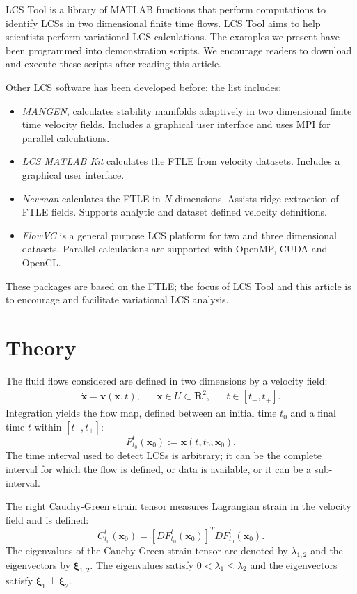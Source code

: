 \documentclass{article}
\newcommand{\reals}{\mathbf R}
\begin{document}
LCS Tool is a library of MATLAB functions that perform computations to identify LCSs in two dimensional finite time flows. LCS Tool aims to help scientists perform variational LCS calculations. The examples we present have been programmed into demonstration scripts. We encourage readers to download and execute these scripts after reading this article.

Other LCS software has been developed before; the list includes:
\begin{itemize}
\item \emph{MANGEN}\parencite{lekien03:_time}, calculates stability manifolds adaptively in two dimensional finite time velocity fields. Includes a graphical user interface and uses MPI for parallel calculations.
\item \emph{LCS MATLAB Kit}\parencite{dabiri09:_lmk} calculates the FTLE from velocity datasets. Includes a graphical user interface.
\item \emph{Newman}\parencite{toit10:_trans} calculates the FTLE in $N$ dimensions. Assists ridge extraction of FTLE fields. Supports analytic and dataset defined velocity definitions.
\item \emph{FlowVC}\parencite{shadden10:_flowvc} is a general purpose LCS platform for two and three dimensional datasets. Parallel calculations are supported with Open\-MP, CUDA and OpenCL.
\end{itemize}
These packages are based on the FTLE; the focus of LCS Tool and this article is to encourage and facilitate variational LCS analysis.

\section{Theory}

The fluid flows considered are defined in two dimensions by a velocity field:
\begin{align*}
\dot{\boldsymbol x} = \boldsymbol v(\boldsymbol x,t), && \boldsymbol x \in U \subset \reals^2, && t \in [t_-,t_+].
\end{align*}
Integration yields the flow map, defined between an initial time $t_0$ and a final time $t$ within $[t_-,t_+]$:
\[
F_{t_0}^t(\boldsymbol x_0) := \boldsymbol x(t,t_0,\boldsymbol x_0).
\]
The time interval used to detect LCSs is arbitrary; it can be the complete interval for which the flow is defined, or data is available, or it can be a sub-interval.

The right Cauchy-Green strain tensor measures Lagrangian strain in the velocity field and is defined:
\[
C_{t_0}^t(\boldsymbol x_0) = \left[D F_{t_0}^t(\boldsymbol x_0)\right]^T D F_{t_0}^t(\boldsymbol x_0).
\]
The eigenvalues of the Cauchy-Green strain tensor are denoted by $\lambda_{1,2}$ and the eigenvectors by $\boldsymbol \xi_{1,2}$. The eigenvalues satisfy $0 < \lambda_1 \leq \lambda_2$ and the eigenvectors satisfy $\boldsymbol \xi_1 \perp \boldsymbol \xi_2$.
\end{document}

